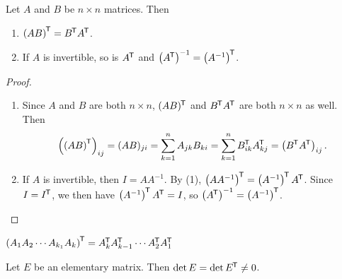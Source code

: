 \begin{thm}\label{transpose-properties}
    Let $A$ and $B$ be $n \times n$ matrices. Then
    \begin{enumerate}[label=(\arabic*)]
        \item $\left(AB\right)^{\mkern-1.5mu\mathsf{T}} = B^{\mkern-1.5mu\mathsf{T}}A^{\mkern-1.5mu\mathsf{T}}$.
        \item If $A$ is invertible, so is $A^{\mkern-1.5mu\mathsf{T}}$ and $\left(A^{\mkern-1.5mu\mathsf{T}}\right)^{-1} = \left(A^{-1}\right)^{\mkern-1.5mu\mathsf{T}}$.
    \end{enumerate}
\end{thm}

\begin{proof}\proofbreak
    \begin{enumerate}[label=(\arabic*)]
        \item Since $A$ and $B$ are both $n \times n$, $(AB)^{\mkern-1.5mu\mathsf{T}}$ and $B^{\mkern-1.5mu\mathsf{T}}A^{\mkern-1.5mu\mathsf{T}}$ are both $n \times n$ as well. Then \[\left(\left(AB\right)^{\mkern-1.5mu\mathsf{T}}\right)_{ij} = (AB)_{ji} = \sum_{k=1}^{n}A_{jk}B_{ki} = \sum_{k=1}^{n}B^{\mkern-1.5mu\mathsf{T}}_{ik}A^{\mkern-1.5mu\mathsf{T}}_{kj} = \left(B^{\mkern-1.5mu\mathsf{T}}A^{\mkern-1.5mu\mathsf{T}}\right)_{ij}.\]
        \item If $A$ is invertible, then $I = AA^{-1}$. By (1), $\left(AA^{-1}\right)^{\mkern-1.5mu\mathsf{T}} = \left(A^{-1}\right)^{\mkern-1.5mu\mathsf{T}}A^{\mkern-1.5mu\mathsf{T}}$. Since $I = I^{\mkern-1.5mu\mathsf{T}}$, we then have $\left(A^{-1}\right)^{\mkern-1.5mu\mathsf{T}}A^{\mkern-1.5mu\mathsf{T}} = I$, so $\left(A^{\mkern-1.5mu\mathsf{T}}\right)^{-1} = \left(A^{-1}\right)^{\mkern-1.5mu\mathsf{T}}$.
    \end{enumerate}
\end{proof}

\begin{cor}\label{transpose-of-product}
    $\left(A_1A_2\cdots A_{k_1}A_k\right)^{\mkern-1.5mu\mathsf{T}} = A_k^{\mkern-1.5mu\mathsf{T}}A_{k-1}^{\mkern-1.5mu\mathsf{T}}\cdots A_2^{\mkern-1.5mu\mathsf{T}}A_1^{\mkern-1.5mu\mathsf{T}}$
\end{cor}

\begin{lemma}\label{elementary-transpose-determinant}
    Let $E$ be an elementary matrix. Then $\det E = \det E^{\mkern-1.5mu\mathsf{T}} \neq 0$.
\end{lemma}

